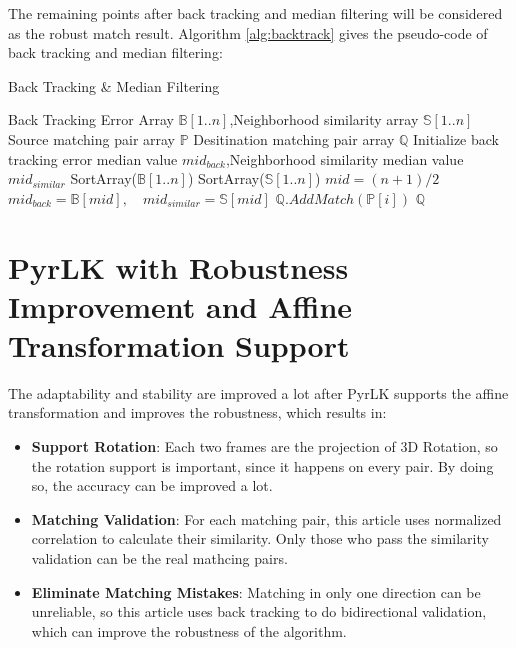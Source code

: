 The remaining points after back tracking and median filtering will be considered as the robust match result.
Algorithm \ref{alg:backtrack} gives the pseudo-code of back tracking and median filtering:\\
\begin{algorithm}[H]
	\caption{Back Tracking \& Median Filtering}
	\label{alg:backtrack}
	\begin{algorithmic}[1]
	\Require Back Tracking Error Array $\mathbb{B}[1..n]$,Neighborhood similarity array $\mathbb{S}[1..n]$
	\Require Source matching pair array $\mathbb{P}$
	\Ensure Desitination matching pair array $\mathbb{Q}$
	\State Initialize back tracking error median value $mid_{back}$,Neighborhood similarity median value $mid_{similar}$
	\State SortArray($\mathbb{B}[1..n]$)
	\State SortArray($\mathbb{S}[1..n]$)
	\State $mid=(n+1)/2$
	\State $mid_{back}=\mathbb{B}[mid],\quad mid_{similar}=\mathbb{S}[mid]$
		\State $\mathbb{Q}.AddMatch(\mathbb{P}[i])$
	\EndIf
	\EndFor
	\State \Return $\mathbb{Q}$
	\end{algorithmic}
\end{algorithm}

\section{PyrLK with Robustness Improvement and Affine Transformation Support}
The adaptability and stability are improved a lot after PyrLK supports the affine transformation
and improves the robustness, which results in:\\
\begin{itemize}
	\item \textbf{Support Rotation}: Each two frames are the projection of 3D Rotation, so the rotation
		support is important, since it happens on every pair. By doing so, the accuracy can be improved a lot.
	\item \textbf{Matching Validation}: For each matching pair, this article uses normalized correlation to 
		calculate their similarity. Only those who pass the similarity validation can be the real mathcing pairs.
	\item \textbf{Eliminate Matching Mistakes}: Matching in only one direction can be unreliable, so this article
		uses back tracking to do bidirectional validation, which can improve the robustness of the algorithm.
\end{itemize}


